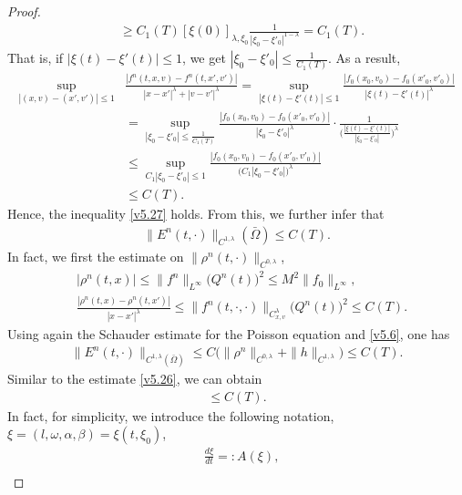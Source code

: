 \documentclass[11pt,reqno]{amsart}%
\theoremstyle{definition}
\theoremstyle{remark}
\begin{document}
\begin{proof}
\begin{align}
&\geq C_{1}(T)[\xi(0)]_{\lambda,\xi_{0}}\frac{1}{|\xi_{0}-\xi'_{0}|^{1-\lambda}}=C_{1}(T).\nonumber
\end{align}
That is, if $|\xi(t)-\xi'(t)|\leq 1$, we get $|\xi_{0}-\xi'_{0}|\leq \frac{1}{C_{1}(T)}$.
As a result,
\begin{align}
\sup_{|(x,v)-(x',v')|\leq 1}&\frac{|f^{n}(t,x,v)-f^{n}(t,x',v')|}{|x-x'|^{\lambda}+|v-v'|^{\lambda}}
=\sup_{|\xi(t)-\xi'(t)|\leq 1}\frac{|f_{0}(x_{0},v_{0})-f_{0}(x'_{0},v'_{0})|}{|\xi(t)-\xi'(t)|^{\lambda}}\nonumber\\
&=\sup_{|\xi_{0}-\xi'_{0}|\leq \frac{1}{C_{1}(T)}}\frac{|f_{0}(x_{0},v_{0})-f_{0}(x'_{0},v'_{0})|}{|\xi_{0}-\xi'_{0}|^{\lambda}}\cdot
\frac{1}{\Big(\frac{|\xi(t)-\xi'(t)|}{|\xi_{0}-\xi'_{0}|}\Big)^{\lambda}}\nonumber\\
&\leq\sup_{C_{1}|\xi_{0}-\xi'_{0}|\leq 1}\frac{|f_{0}(x_{0},v_{0})-f_{0}(x'_{0},v'_{0})|}{\big(C_{1}|\xi_{0}-\xi'_{0}|\big)^{\lambda}}\nonumber\\
&\leq C(T).\nonumber
\end{align}
Hence, the inequality \eqref{v5.27} holds.
From this,  we further infer that
\begin{align}
\|E^{n}(t,\cdot)\|_{C^{1,\lambda}}(\bar{\Omega})\leq C(T).\label{v5.28}
\end{align}
In fact, we first the estimate on $\|\rho^{n}(t,\cdot)\|_{C^{0,\lambda}}$,
\begin{align}
&|\rho^{n}(t,x)|\leq \|f^{n}\|_{L^{\infty}}\big(Q^{n}(t)\big)^{2}\leq M^{2}\|f_{0}\|_{L^{\infty}},\nonumber\\
&\frac{|\rho^{n}(t,x)-\rho^{n}(t,x')|}{|x-x'|^{\lambda}}\leq \|f^{n}(t,\cdot,\cdot)\|_{C^{\lambda}_{x,v}}\big(Q^{n}(t)\big)^{2}\leq C(T).\nonumber
\end{align}
Using again the Schauder estimate for the Poisson equation and \eqref{v5.6}, one has
\begin{align}
\|E^{n}(t,\cdot)\|_{C^{1,\lambda}(\bar{\Omega})}\leq C\big(\|\rho^{n}\|_{C^{0,\lambda}}+\|h\|_{C^{1,\lambda}}\big) \leq C(T).\nonumber
\end{align}
Similar to the estimate \eqref{v5.26}, we can obtain
\begin{align}
[\frac{\partial \xi}{\partial\xi_{0}}]\leq C(T).\label{v5.29}
\end{align}
 In fact, for simplicity, we introduce the following notation, $\xi=(l,\omega,\alpha,\beta)=\xi(t,\xi_{0})$,
\begin{align}
&\frac{d \xi}{d t}=:A(\xi),\nonumber\\

\end{align}
\end{proof}
\end{document}
